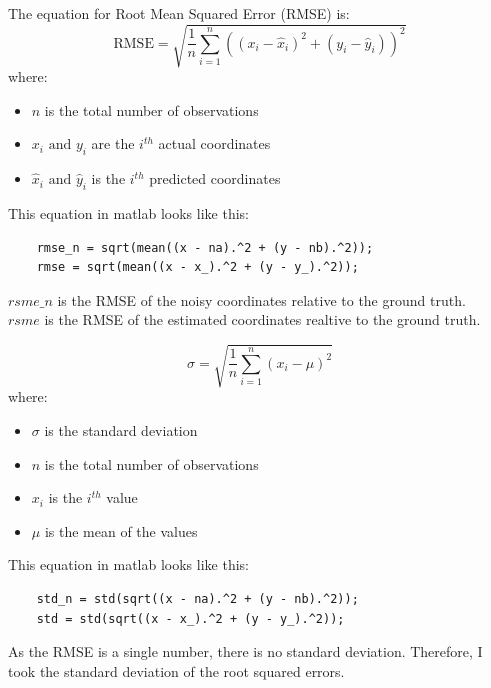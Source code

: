 \documentclass[conference]{IEEEtran}
\begin{document}
        The equation for Root Mean Squared Error (RMSE) is:
        \begin{equation}
            \text{RMSE} = \sqrt{\frac{1}{n}\sum_{i=1}^{n}{((x_i - \hat{x}_i)^2 + (y_i - \hat{y}_i))}^2}
        \end{equation}
        where:
        \begin{itemize}
            \item $n$ is the total number of observations
            \item $x_i \text{ and } y_i$ are the $i^{th}$ actual coordinates
            \item $\hat{x}_i \text{ and } \hat{y}_i$ is the $i^{th}$ predicted coordinates
        \end{itemize}
        This equation in matlab looks like this:
        \scriptsize
        \begin{lstlisting}[style=Matlab-editor, basicstyle=\scriptsize]
    % Root Mean Squared Error (RMSE) calculation
    rmse_n = sqrt(mean((x - na).^2 + (y - nb).^2));
    rmse = sqrt(mean((x - x_).^2 + (y - y_).^2));
        \end{lstlisting}
        \normalsize
        $rsme\_n$ is the RMSE of the noisy coordinates relative to the ground truth.\\
        $rsme$ is the RMSE of the estimated coordinates realtive to the ground truth.


        \begin{equation}
            \sigma = \sqrt{\frac{1}{n}\sum_{i=1}^{n}{(x_i - \mu)}^2}
        \end{equation}    
        where:
        \begin{itemize}
            \item $\sigma$ is the standard deviation
            \item $n$ is the total number of observations
            \item $x_i$ is the $i^{th}$ value
            \item $\mu$ is the mean of the values
        \end{itemize}        
        This equation in matlab looks like this:
        \begin{lstlisting}[style=Matlab-editor, basicstyle=\scriptsize]
    % Standard deviation calculation of the RMSE
    std_n = std(sqrt((x - na).^2 + (y - nb).^2));
    std = std(sqrt((x - x_).^2 + (y - y_).^2));
        \end{lstlisting}
        \normalsize
        As the RMSE is a single number, there is no standard deviation. Therefore, I took the standard deviation of the root squared errors.
\end{document}
